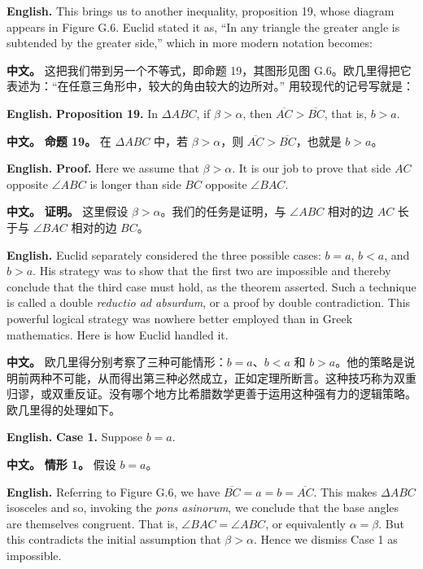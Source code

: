 \noindent\textbf{English.} This brings us to another inequality, proposition 19, whose diagram appears in Figure G.6. Euclid stated it as, ``In any triangle the greater angle is subtended by the greater side,'' which in more modern notation becomes:

\noindent\textbf{中文。} 这把我们带到另一个不等式，即命题 19，其图形见图 G.6。欧几里得把它表述为：``在任意三角形中，较大的角由较大的边所对。'' 用较现代的记号写就是：

\noindent\textbf{English.} \textbf{Proposition 19.} In $\Delta ABC$, if $\beta>\alpha$, then $\overline{AC}>\overline{BC}$, that is, $b>a$.

\noindent\textbf{中文。} \textbf{命题 19。} 在 $\Delta ABC$ 中，若 $\beta>\alpha$，则 $\overline{AC}>\overline{BC}$，也就是 $b>a$。

\noindent\textbf{English.} \textbf{Proof.} Here we assume that $\beta>\alpha$. It is our job to prove that side $AC$ opposite $\angle ABC$ is longer than side $BC$ opposite $\angle BAC$.

\noindent\textbf{中文。} \textbf{证明。} 这里假设 $\beta>\alpha$。我们的任务是证明，与 $\angle ABC$ 相对的边 $AC$ 长于与 $\angle BAC$ 相对的边 $BC$。

\noindent\textbf{English.} Euclid separately considered the three possible cases: $b=a$, $b<a$, and $b>a$. His strategy was to show that the first two are impossible and thereby conclude that the third case must hold, as the theorem asserted. Such a technique is called a double \textit{reductio ad absurdum}, or a proof by double contradiction. This powerful logical strategy was nowhere better employed than in Greek mathematics. Here is how Euclid handled it.

\noindent\textbf{中文。} 欧几里得分别考察了三种可能情形：$b=a$、$b<a$ 和 $b>a$。他的策略是说明前两种不可能，从而得出第三种必然成立，正如定理所断言。这种技巧称为双重归谬，或双重反证。没有哪个地方比希腊数学更善于运用这种强有力的逻辑策略。欧几里得的处理如下。

\noindent\textbf{English.} \textbf{Case 1.} Suppose $b=a$.

\noindent\textbf{中文。} \textbf{情形 1。} 假设 $b=a$。

\noindent\textbf{English.} Referring to Figure G.6, we have $\overline{BC}=a=b=\overline{AC}$. This makes $\Delta ABC$ isosceles and so, invoking the \textit{pons asinorum}, we conclude that the base angles are themselves congruent. That is, $\angle BAC=\angle ABC$, or equivalently $\alpha=\beta$. But this contradicts the initial assumption that $\beta>\alpha$. Hence we dismiss Case 1 as impossible.

